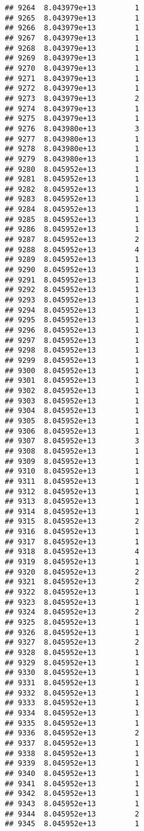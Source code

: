 \documentclass[
]{article}
\begin{document}
\begin{verbatim}
## 9264  8.043979e+13         1
## 9265  8.043979e+13         1
## 9266  8.043979e+13         1
## 9267  8.043979e+13         1
## 9268  8.043979e+13         1
## 9269  8.043979e+13         1
## 9270  8.043979e+13         1
## 9271  8.043979e+13         1
## 9272  8.043979e+13         1
## 9273  8.043979e+13         2
## 9274  8.043979e+13         1
## 9275  8.043979e+13         1
## 9276  8.043980e+13         3
## 9277  8.043980e+13         1
## 9278  8.043980e+13         1
## 9279  8.043980e+13         1
## 9280  8.045952e+13         1
## 9281  8.045952e+13         1
## 9282  8.045952e+13         1
## 9283  8.045952e+13         1
## 9284  8.045952e+13         1
## 9285  8.045952e+13         1
## 9286  8.045952e+13         1
## 9287  8.045952e+13         2
## 9288  8.045952e+13         4
## 9289  8.045952e+13         1
## 9290  8.045952e+13         1
## 9291  8.045952e+13         1
## 9292  8.045952e+13         1
## 9293  8.045952e+13         1
## 9294  8.045952e+13         1
## 9295  8.045952e+13         1
## 9296  8.045952e+13         1
## 9297  8.045952e+13         1
## 9298  8.045952e+13         1
## 9299  8.045952e+13         1
## 9300  8.045952e+13         1
## 9301  8.045952e+13         1
## 9302  8.045952e+13         1
## 9303  8.045952e+13         1
## 9304  8.045952e+13         1
## 9305  8.045952e+13         1
## 9306  8.045952e+13         1
## 9307  8.045952e+13         3
## 9308  8.045952e+13         1
## 9309  8.045952e+13         1
## 9310  8.045952e+13         1
## 9311  8.045952e+13         1
## 9312  8.045952e+13         1
## 9313  8.045952e+13         1
## 9314  8.045952e+13         1
## 9315  8.045952e+13         2
## 9316  8.045952e+13         1
## 9317  8.045952e+13         1
## 9318  8.045952e+13         4
## 9319  8.045952e+13         1
## 9320  8.045952e+13         2
## 9321  8.045952e+13         2
## 9322  8.045952e+13         1
## 9323  8.045952e+13         1
## 9324  8.045952e+13         2
## 9325  8.045952e+13         1
## 9326  8.045952e+13         1
## 9327  8.045952e+13         2
## 9328  8.045952e+13         1
## 9329  8.045952e+13         1
## 9330  8.045952e+13         1
## 9331  8.045952e+13         1
## 9332  8.045952e+13         1
## 9333  8.045952e+13         1
## 9334  8.045952e+13         1
## 9335  8.045952e+13         1
## 9336  8.045952e+13         2
## 9337  8.045952e+13         1
## 9338  8.045952e+13         1
## 9339  8.045952e+13         1
## 9340  8.045952e+13         1
## 9341  8.045952e+13         1
## 9342  8.045952e+13         1
## 9343  8.045952e+13         1
## 9344  8.045952e+13         2
## 9345  8.045952e+13         1

\end{verbatim}
\end{document}

